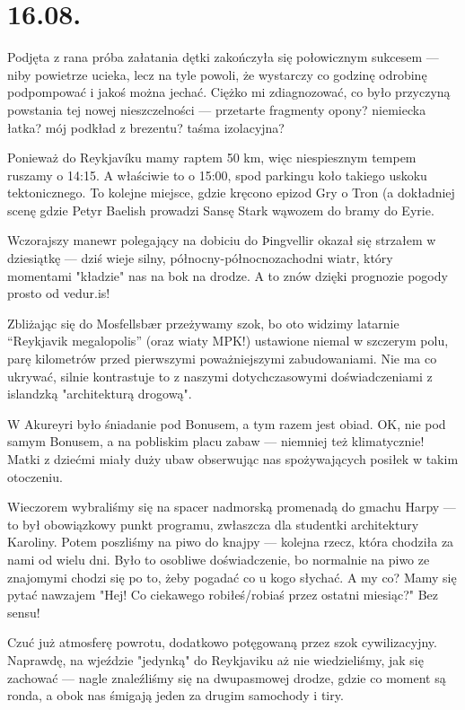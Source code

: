 \chapter*{16.08.}

Podjęta z rana próba załatania dętki zakończyła się połowicznym sukcesem --- niby powietrze ucieka, lecz na tyle powoli, że wystarczy co godzinę odrobinę podpompować i jakoś można jechać. Ciężko mi zdiagnozować, co było przyczyną powstania tej nowej nieszczelności --- przetarte fragmenty opony? niemiecka łatka? mój podkład z brezentu? taśma izolacyjna?

Ponieważ do Reykjavíku mamy raptem 50 km, więc niespiesznym tempem ruszamy o 14:15. A właściwie to o 15:00, spod parkingu koło takiego uskoku tektonicznego. To kolejne miejsce, gdzie kręcono epizod Gry o Tron (a dokładniej scenę gdzie Petyr Baelish prowadzi Sansę Stark wąwozem do bramy do Eyrie.

Wczorajszy manewr polegający na dobiciu do Þingvellir okazał się strzałem w dziesiątkę --- dziś wieje silny, północny-północnozachodni wiatr, który momentami "kładzie" nas na bok na drodze. A to znów dzięki prognozie pogody prosto od vedur.is!

Zbliżając się do Mosfellsbær przeżywamy szok, bo oto widzimy latarnie “Reykjavik megalopolis” (oraz wiaty MPK!) ustawione niemal w szczerym polu, parę kilometrów przed pierwszymi poważniejszymi zabudowaniami. Nie ma co ukrywać, silnie kontrastuje to z naszymi dotychczasowymi doświadczeniami z islandzką "architekturą drogową".


W Akureyri było śniadanie pod Bonusem, a tym razem jest obiad. OK, nie pod samym Bonusem, a na pobliskim placu zabaw --- niemniej też klimatycznie! Matki z dziećmi miały duży ubaw obserwując nas spożywających posiłek w takim otoczeniu.

Wieczorem wybraliśmy się na spacer nadmorską promenadą do gmachu Harpy --- to był obowiązkowy punkt programu, zwłaszcza dla studentki architektury Karoliny. Potem poszliśmy na piwo do knajpy --- kolejna rzecz, która chodziła za nami od wielu dni. Było to osobliwe doświadczenie, bo normalnie na piwo ze znajomymi chodzi się po to, żeby pogadać co u kogo słychać. A my co? Mamy się pytać nawzajem "Hej! Co ciekawego robiłeś/robiaś przez ostatni miesiąc?" Bez sensu!

Czuć już atmosferę powrotu, dodatkowo potęgowaną przez szok cywilizacyjny. Naprawdę, na wjeździe "jedynką" do Reykjaviku aż nie wiedzieliśmy, jak się zachować --- nagle znaleźliśmy się na dwupasmowej drodze, gdzie co moment są ronda, a obok nas śmigają jeden za drugim samochody i tiry.

